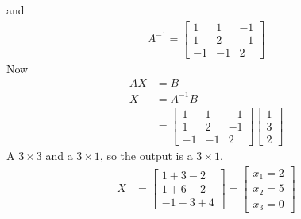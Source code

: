 \documentclass[14pt]{extarticle}
\begin{document}
and
\begin{align*}
	A^{-1} = \begin{bmatrix}
		1 & 1 & -1 \\
		1 & 2 & -1 \\
		-1 & -1 & 2
	\end{bmatrix}
\end{align*}
Now
\begin{align*}
	AX&=B \\
	X &=A^{-1}B \\
	&= \begin{bmatrix}
		1 & 1 & -1 \\
		1 & 2 & -1 \\
		-1 & -1 & 2
	\end{bmatrix}
	\begin{bmatrix}	1 \\3 \\2\end{bmatrix}
\end{align*}
A $3\times 3$ and a $3\times 1$, so the output is a $3 \times 1$.
\begin{align*}
	X &= \begin{bmatrix}
		1+3-2 \\
		1+6-2 \\
		-1-3+4
	\end{bmatrix}
	= \begin{bmatrix}	x_1=2 \\	x_2=5 \\ x_3=0	\end{bmatrix}
\end{align*}
\end{document}
